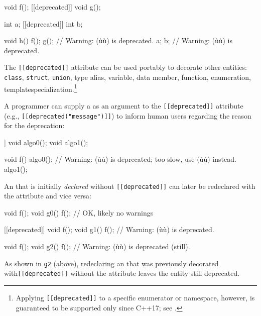 \begin{emcppslisting}
               void f();
[[deprecated]] void g();

               int a;
[[deprecated]] int b;

void h()
{
    f();
    g();  // Warning: (ù{}ù) is deprecated.
    a;
    b;    // Warning: (ù{}ù) is deprecated.
}
\end{emcppslisting}
    
\noindent The \lstinline![[deprecated]]! attribute can be
used portably to decorate other entities: \lstinline!class!,
\lstinline!struct!, \lstinline!union!, type alias, variable, data member,
function, enumeration, template\linebreak[4] \mbox{specialization}.\footnote{Applying
\lstinline![[deprecated]]! to a specific enumerator or namespace,
however, is guaranteed to be supported only since C++17; see \cite{smith15a}.}

A programmer can supply a  as an
argument to the \mbox{\lstinline![[deprecated]]!} attribute (e.g.,
\mbox{\lstinline![[deprecated("message")]]!}) to inform human users regarding the
reason for the deprecation:

\begin{emcppslisting}
[[deprecated("too slow, use (ù{\codeincomments{algo1}}ù) instead")]] void algo0();
                                              void algo1();

void f()
{
    algo0();  // Warning: (ù{}ù) is deprecated; too slow, use (ù{}ù) instead.
    algo1();
}
\end{emcppslisting}
    
\noindent An  that is initially \emph{declared} without
\lstinline![[deprecated]]! can later be redeclared with the attribute and
vice versa:

\begin{emcppslisting}
void f();
void g0() { f(); }  // OK, likely no warnings

[[deprecated]] void f();
void g1() { f(); }  // Warning: (ù{}ù) is deprecated.

void f();
void g2() { f(); }  // Warning: (ù{}ù) is deprecated (still).
\end{emcppslisting}
    
\noindent As shown in \lstinline!g2! (above), redeclaring an  that was
previously decorated with\linebreak[4] \mbox{\lstinline![[deprecated]]!} without the attribute leaves the entity still deprecated.


